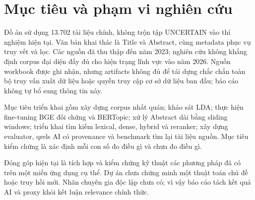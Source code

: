 \section{Mục tiêu và phạm vi nghiên cứu}
Đồ án sử dụng 13.702 tài liệu chính, không trộn tập UNCERTAIN vào thí nghiệm hiện tại. Văn bản khai thác là Title và Abstract, cùng metadata phục vụ truy vết và lọc. Các nguồn đã thu thập đến năm 2023; nghiên cứu không khẳng định corpus đại diện đầy đủ cho hiện trạng lĩnh vực vào năm 2026. Nguồn workbook được ghi nhận, nhưng artifacts không đủ để tái dựng chắc chắn toàn bộ truy vấn xuất dữ liệu hoặc quyền truy cập cơ sở dữ liệu ban đầu; báo cáo không tự bổ sung thông tin này.

Mục tiêu triển khai gồm xây dựng corpus nhất quán; khảo sát LDA; thực hiện fine-tuning BGE đối chứng và BERTopic; xử lý Abstract dài bằng sliding windows; triển khai tìm kiếm lexical, dense, hybrid và reranker; xây dựng evaluator, qrels AI có provenance và benchmark tìm lại tài liệu nguồn. Mục tiêu kiểm chứng là xác định mỗi con số đo điều gì và chưa đo điều gì.

Đóng góp hiện tại là tích hợp và kiểm chứng kỹ thuật các phương pháp đã có trên một miền ứng dụng cụ thể. Dự án chưa chứng minh một thuật toán chủ đề hoặc truy hồi mới. Nhãn chuyên gia độc lập chưa có; vì vậy báo cáo tách kết quả AI và proxy khỏi kết luận relevance chính thức.

